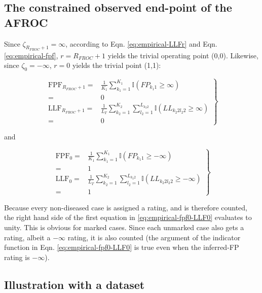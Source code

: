 \documentclass[
]{book}
\begin{document}
\hypertarget{empirical-AFROC-constrained}{%
\subsection{The constrained observed end-point of the AFROC}\label{empirical-AFROC-constrained}}

Since \(\zeta_{R_{FROC}+1} = \infty\), according to Eqn. \eqref{eq:empirical-LLFr} and Eqn. \eqref{eq:empirical-fpf}, \(r = R_{FROC}+1\) yields the trivial operating point (0,0). Likewise, since \(\zeta_0 = -\infty\), \(r = 0\) yields the trivial point (1,1):

\begin{equation}
\left.
\begin{aligned} 
\text{FPF}_{R_{FROC}+1} =& \frac{1}{K_1} \sum_{k_1=1}^{K_1} \mathbb{I} \left ( FP_{k_1 1} \geq \infty \right )\\
=& 0\\
\text{LLF}_{R_{FROC}+1} =& \frac{1}{L_T} \sum_{k_2=1}^{K_2} \sum_{l_2=1}^{L_{k_2 2}}\mathbb{I} \left ( LL_{k_2 2 l_2 2} \geq \infty \right )\\
=& 0
\end{aligned}
\right \}
\label{eq:empirical-fpf-LLF-last}
\end{equation}

and

\begin{equation}
\left.
\begin{aligned} 
\text{FPF}_0 =& \frac{1}{K_1} \sum_{k_1=1}^{K_1} \mathbb{I} \left ( FP_{k_1 1} \geq -\infty \right )\\
=& 1\\
\text{LLF}_0 =& \frac{1}{L_T} \sum_{k_2=1}^{K_2} \sum_{l_2=1}^{L_{k_2 2}}\mathbb{I} \left ( LL_{k_2 2 l_2 2} \geq -\infty \right )\\
=& 1
\end{aligned}
\right \}
\label{eq:empirical-fpf0-LLF0}
\end{equation}

Because every non-diseased case is assigned a rating, and is therefore counted, the right hand side of the first equation in \eqref{eq:empirical-fpf0-LLF0} evaluates to unity. This is obvious for marked cases. Since each unmarked case also gets a rating, albeit a \(-\infty\) rating, it is also counted (the argument of the indicator function in Eqn. \eqref{eq:empirical-fpf0-LLF0} is true even when the inferred-FP rating is \(-\infty\)).

\hypertarget{empirical-afroc-plot-illustration}{%
\subsection{Illustration with a dataset}\label{empirical-afroc-plot-illustration}}
\end{document}
